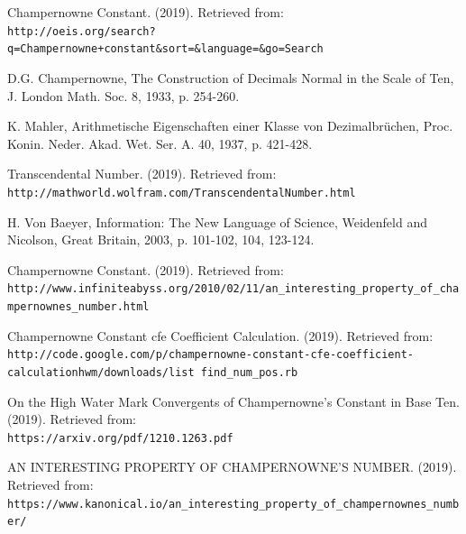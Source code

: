\documentclass{article}
\begin{document}
\begin{thebibliography}{9}

Champernowne Constant. (2019). Retrieved from: \\\texttt{http://oeis.org/search?q=Champernowne+constant\&sort=\&language=\&go=Search}

D.G. Champernowne, The Construction of Decimals Normal in the Scale of Ten, J. London Math. Soc. 8, 1933, p. 254-260.
 
K. Mahler, Arithmetische Eigenschaften einer Klasse von Dezimalbrüchen, Proc. Konin. Neder. Akad. Wet. Ser. A. 40, 1937, p. 421-428.
 

Transcendental Number. (2019). Retrieved from:  \\\texttt{http://mathworld.wolfram.com/TranscendentalNumber.html}

H. Von Baeyer, Information: The New Language of Science, Weidenfeld and Nicolson, Great Britain, 2003, p. 101-102, 104, 123-124. 

Champernowne Constant. (2019). Retrieved from:  \\\texttt{http://www.infiniteabyss.org/2010/02/11/an\_interesting\_property\_of\_champernownes\_number.html}

Champernowne Constant cfe Coefficient Calculation. (2019). Retrieved from: \\\texttt{http://code.google.com/p/champernowne-constant-cfe-coefficient-calculationhwm/downloads/list find\_num\_pos.rb}

On the High Water Mark Convergents of Champernowne’s Constant in Base Ten. (2019). Retrieved from: \\\texttt{https://arxiv.org/pdf/1210.1263.pdf}

AN INTERESTING PROPERTY OF CHAMPERNOWNE'S NUMBER.  (2019). Retrieved from: \\\texttt{https://www.kanonical.io/an\_interesting\_property\_of\_champernownes\_number/}
\end{thebibliography}
\end{document}

